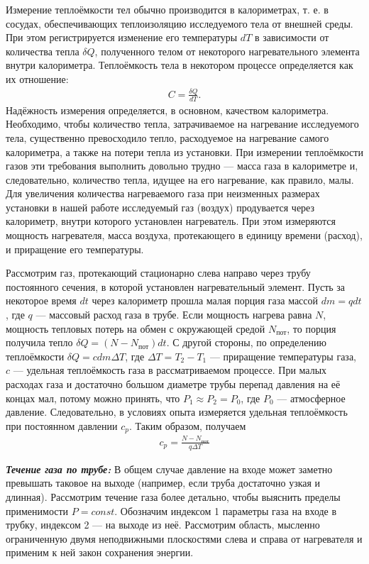 \documentclass[a4paper, 12pt]{article}%
\begin{document}
	
	Измерение теплоёмкости тел обычно производится в калориметрах, т. е. в
	сосудах, обеспечивающих теплоизоляцию исследуемого тела от внешней
	среды. При этом регистрируется изменение его температуры $dT$ в зависимости от количества тепла $\delta Q$, полученного телом от некоторого нагревательного элемента внутри калориметра. Теплоёмкость тела в некотором процессе определяется как их отношение:
	\begin{align}
		C = \frac{\delta Q}{dT}.
	\end{align}
	Надёжность измерения определяется, в основном, качеством калориметра.
	Необходимо, чтобы количество тепла, затрачиваемое на нагревание исследуемого тела, существенно превосходило тепло, расходуемое на нагревание самого калориметра, а также на потери тепла из установки. При измерении теплоёмкости газов эти требования выполнить довольно трудно — масса газа в калориметре и, следовательно, количество тепла, идущее на его нагревание, как правило, малы. Для увеличения количества нагреваемого газа при неизменных размерах установки в нашей работе исследуемый газ (воздух) продувается через калориметр, внутри которого установлен нагреватель. При этом измеряются мощность нагревателя, масса воздуха, протекающего в единицу времени (расход), и приращение его температуры.
	
	Рассмотрим газ, протекающий стационарно слева направо через
	трубу постоянного сечения, в которой установлен нагревательный элемент. Пусть за некоторое
	время $dt$ через калориметр прошла малая порция газа массой $dm = q dt$, где $q$ --- массовый расход газа в трубе. Если мощность нагрева равна $N$, мощность тепловых потерь на обмен с окружающей средой $N_{\text{пот}}$, то порция получила тепло $\delta Q = (N - N_{\text{пот}})dt$. С другой стороны, по определению теплоёмкости $\delta Q = c dm \Delta T$, где $\Delta T = T_2 - T_1$ --- приращение температуры газа, $c$ --- удельная теплоёмкость газа в рассматриваемом процессе. При малых расходах газа и достаточно большом диаметре трубы перепад давления на её концах мал, потому можно принять, что $P_1 \approx P_2 = P_0$, где $P_0$ --- атмосферное давление. Следовательно, в условиях опыта измеряется удельная теплоёмкость при постоянном давлении $c_p$. Таким образом, получаем
	\begin{align}
		c_p = \frac{N - N_{\text{пот}}}{q \Delta T}
	\end{align}
	
	\textbf{\textit{Течение газа по трубе:}}
		В общем случае давление
	на входе может заметно превышать таковое на выходе
	(например, если труба достаточно узкая и длинная). Рассмотрим течение газа более
	детально, чтобы выяснить пределы применимости $P = const$. Обозначим индексом 1 параметры газа на входе в трубку, индексом 2 --- на выходе из неё. Рассмотрим область, мысленно ограниченную двумя неподвижными плоскостями слева и справа от нагревателя и применим к ней закон сохранения энергии.
	
\end{document}
